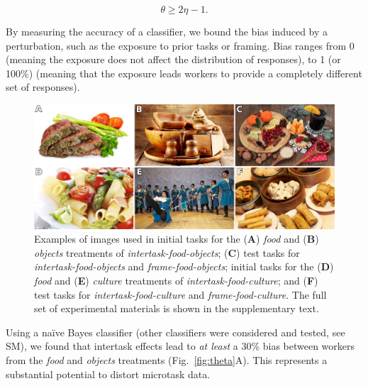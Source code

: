 \documentclass{pnastwo}
\begin{document}
\begin{article}
\begin{equation}
	\theta \geq 2\eta - 1.
	\label{l1}
\end{equation}

By measuring the accuracy of a classifier, we bound the bias induced by a
perturbation, such as the exposure to prior tasks or framing.  Bias ranges from
0 (meaning the exposure does not affect the distribution of responses), to 1
(or 100\%) (meaning that the exposure leads workers to provide a completely
different set of responses).

\begin{figure}
	\centering
	\includegraphics[scale=1.0]{figs/images.jpg}
	\caption{
		Examples of images used in
		initial tasks for the (\textbf{A}) \textit{food} and (\textbf{B}) 
		\textit{objects} treatments of \textit{intertask-food-objects};
		(\textbf{C}) test tasks for \textit{intertask-food-objects} and 
		\textit{frame-food-objects};
		initial tasks for the (\textbf{D}) \textit{food} and (\textbf{E}) 
		\textit{culture} treatments of \textit{intertask-food-culture};
		and (\textbf{F}) test tasks for \textit{intertask-food-culture} and 
		\textit{frame-food-culture}.
		The full set of experimental materials is shown in the 
		supplementary text.
	}

	\label{fig:task}
\end{figure}

Using a na\"ive Bayes classifier (other classifiers were considered and tested,
see SM), we found that intertask effects lead to {\it at least} a 30\% bias between workers
from the \textit{food} and \textit{objects} treatments (Fig.~\ref{fig:theta}A).
This represents a substantial potential to distort microtask data.


\end{article}
\end{document}
